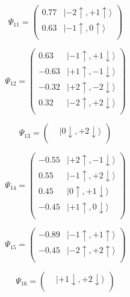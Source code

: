 \documentclass{article}
\begin{document}
\begin{equation}
\Psi_{11} = 
\begin{pmatrix}
      0.77  &  |-2\uparrow , +1\uparrow\rangle  \\
      0.63  &  |-1\uparrow , 0\uparrow\rangle  \\
\end{pmatrix}
\end{equation}

\begin{equation}
\Psi_{12} = 
\begin{pmatrix}
      0.63  &  |-1\uparrow , +1\downarrow\rangle  \\
-      0.63  &  |+1\uparrow , -1\downarrow\rangle  \\
-      0.32  &  |+2\uparrow , -2\downarrow\rangle  \\
      0.32  &  |-2\uparrow , +2\downarrow\rangle  \\
\end{pmatrix}
\end{equation}

\begin{equation}
\Psi_{13} = 
\begin{pmatrix}
  &  |0\downarrow , +2\downarrow\rangle  \\
\end{pmatrix}
\end{equation}

\begin{equation}
\Psi_{14} = 
\begin{pmatrix}
-      0.55  &  |+2\uparrow , -1\downarrow\rangle  \\
      0.55  &  |-1\uparrow , +2\downarrow\rangle  \\
      0.45  &  |0\uparrow , +1\downarrow\rangle  \\
-      0.45  &  |+1\uparrow , 0\downarrow\rangle  \\
\end{pmatrix}
\end{equation}

\begin{equation}
\Psi_{15} = 
\begin{pmatrix}
-      0.89  &  |-1\uparrow , +1\uparrow\rangle  \\
-      0.45  &  |-2\uparrow , +2\uparrow\rangle  \\
\end{pmatrix}
\end{equation}

\begin{equation}
\Psi_{16} = 
\begin{pmatrix}
  &  |+1\downarrow , +2\downarrow\rangle  \\
\end{pmatrix}
\end{equation}
\end{document}
